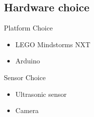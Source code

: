 \subsection{Hardware choice}
\begin{frame}{Platform Choice}
\begin{itemize}
 \item LEGO Mindstorms NXT
 \item Arduino
\end{itemize}
\end{frame}

\begin{frame}{Sensor Choice}
\begin{itemize}
 \item Ultrasonic sensor
 \item Camera
\end{itemize}
\end{frame}
 
